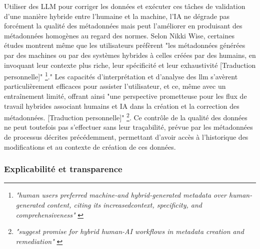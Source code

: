 Utiliser des LLM pour corriger les données et exécuter ces tâches de validation d'une manière hybride entre l'humaine et la machine, l'IA ne dégrade pas forcément la qualité des métadonnées mais peut l'améliorer en produisant des métadonnées homogènes au regard des normes. Selon Nikki Wise, certaines études montrent même que les utilisateurs préfèrent "les métadonnées générées par des machines ou par des systèmes hybrides à celles créées par des humains, en invoquant leur contexte plus riche, leur spécificité et leur exhaustivité [Traduction personnelle]" \footnote{\textit{"human users preferred machine-and hybrid-generated metadata over human-generated content, citing its increasedcontext, specificity, and comprehensiveness"} \cite{wise2026}}." Les capacités d'interprétation et d'analyse des \gls{llm} s'avèrent particulièrement efficaces pour assister l'utilisateur, et ce, même avec un entraînement limité, offrant ainsi "une perspective prometteuse pour les flux de travail hybrides associant humains et IA dans la création et la correction des métadonnées. [Traduction personnelle]" \footnote{\textit{"suggest promise for hybrid human-AI workflows in metadata creation and remediation"} \cite{wise2026}}.
Ce contrôle de la qualité des données ne peut toutefois pas s'effectuer sans leur traçabilité, prévue par les métadonnées de processus décrites précédemment, permettant d'avoir accès à l'historique des modifications et au contexte de création de ces données.



\subsubsection{Explicabilité et transparence}  

